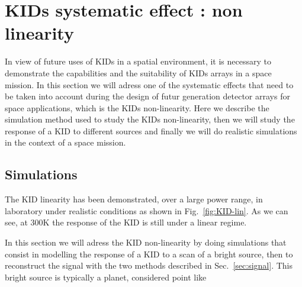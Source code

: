 
\section{KIDs systematic effect : non linearity}
\label{sec:KID-systematics}

In view of future uses of KIDs in a spatial environment, it is necessary to demonstrate the capabilities and the suitability of KIDs arrays in a space mission. In this section we will adress one of the systematic effects that need to be taken into account during the design of futur generation detector arrays for space applications, which is the KIDs non-linearity. Here we describe the simulation method used to study the KIDs non-linearity, then we will study the response of a KID to different sources and finally we will do realistic simulations in the context of a space mission.

\subsection{Simulations}

The KID linearity has been demonstrated, over a large power range, in laboratory
under realistic conditions as shown in Fig.~\ref{fig:KID-lin}. As we can see, at
300K the response of the KID is still under a linear regime.


In this section we will adress the KID non-linearity by doing simulations that consist in modelling the response of a KID to a scan of a bright source, then to reconstruct the signal with the two methods described in Sec.~\ref{sec:signal}. This bright source is typically a planet, considered point like 


